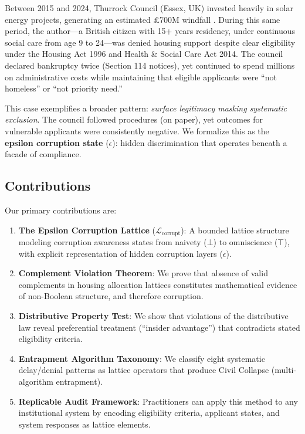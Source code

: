\documentclass[11pt,a4paper]{article}
\theoremstyle{definition}
\begin{document}
Between 2015 and 2024, Thurrock Council (Essex, UK) invested heavily in solar energy projects, generating an estimated £700M windfall \cite{bbc_thurrock_2023}. During this same period, the author—a British citizen with 15+ years residency, under continuous social care from age 9 to 24—was denied housing support despite clear eligibility under the Housing Act 1996 and Health \& Social Care Act 2014. The council declared bankruptcy twice (Section 114 notices), yet continued to spend millions on administrative costs while maintaining that eligible applicants were ``not homeless'' or ``not priority need.''

This case exemplifies a broader pattern: \emph{surface legitimacy masking systematic exclusion}. The council followed procedures (on paper), yet outcomes for vulnerable applicants were consistently negative. We formalize this as the \textbf{epsilon corruption state} ($\epsilon$): hidden discrimination that operates beneath a facade of compliance.

\subsection{Contributions}

Our primary contributions are:

\begin{enumerate}
    \item \textbf{The Epsilon Corruption Lattice} ($\mathcal{L}_{\text{corrupt}}$): A bounded lattice structure modeling corruption awareness states from naivety ($\bot$) to omniscience ($\top$), with explicit representation of hidden corruption layers ($\epsilon$).
    
    \item \textbf{Complement Violation Theorem}: We prove that absence of valid complements in housing allocation lattices constitutes mathematical evidence of non-Boolean structure, and therefore corruption.
    
    \item \textbf{Distributive Property Test}: We show that violations of the distributive law reveal preferential treatment (``insider advantage'') that contradicts stated eligibility criteria.
    
    \item \textbf{Entrapment Algorithm Taxonomy}: We classify eight systematic delay/denial patterns as lattice operators that produce Civil Collapse (multi-algorithm entrapment).
    
    \item \textbf{Replicable Audit Framework}: Practitioners can apply this method to any institutional system by encoding eligibility criteria, applicant states, and system responses as lattice elements.
\end{enumerate}
\end{document}

